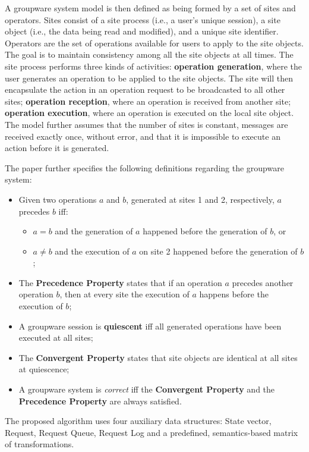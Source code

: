 A groupware system model is then defined as being formed by a set of sites and operators. Sites consist of a site process (i.e., a user's unique session), a site object (i.e., the data being read and modified), and a unique site identifier. Operators are the set of operations available for users to apply to the site objects. The goal is to maintain consistency among all the site objects at all times. The site process performs three kinds of activities: \textbf{operation generation}, where the user generates an operation to be applied to the site objects. The site will then encapsulate the action in an operation request to be broadcasted to all other sites; \textbf{operation reception}, where an operation is received from another site; \textbf{operation execution}, where an operation is executed on the local site object. The model further assumes that the number of sites is constant, messages are received exactly once, without error, and that it is impossible to execute an action before it is generated.

The paper further specifies the following definitions regarding the groupware system:

\begin{itemize}
    \item Given two operations $a$ and $b$, generated at sites 1 and 2, respectively, $a$ precedes $b$ iff:
    \begin{itemize}
        \item $a = b$ and the generation of $a$ happened before the generation of $b$, or
        \item $a \neq b$ and the execution of $a$ on site 2 happened before the generation of $b$;
    \end{itemize}
    \item The \textbf{Precedence Property} states that if an operation $a$ precedes another operation $b$, then at every site the execution of $a$ happens before the execution of $b$;
    \item A groupware session is \textbf{quiescent} iff all generated operations have been executed at all sites;
    \item The \textbf{Convergent Property} states that site objects are identical at all sites at quiescence;
    \item A groupware system is \textit{correct} iff the \textbf{Convergent Property} and the \textbf{Precedence Property} are always satisfied.
\end{itemize}

The proposed algorithm uses four auxiliary data structures: State vector, Request, Request Queue, Request Log and a predefined, semantics-based matrix of transformations. 

